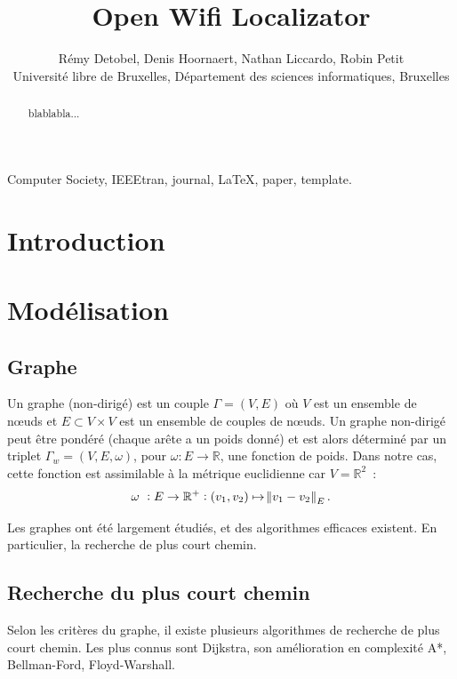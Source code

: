 \documentclass[10pt,journal,compsoc]{IEEEtran}
\newcommand{\R}{\mathbb R}
\begin{document}
\title{Open Wifi Localizator}
\author{Rémy Detobel, Denis Hoornaert, Nathan Liccardo, Robin Petit\\ Université libre de Bruxelles, Département des sciences informatiques, Bruxelles}

\maketitle

\begin{abstract}
  blablabla...
\end{abstract}
\begin{IEEEkeywords}
  Computer Society, IEEEtran, journal, \LaTeX, paper, template.
\end{IEEEkeywords}

\tableofcontents

\section{Introduction}
\section{Modélisation}
  \subsection{Graphe}
    Un graphe (non-dirigé) est un couple $\Gamma = (V, E)$ où $V$ est un ensemble de nœuds et $E \subset V \times V$ est un ensemble de couples de nœuds.
	Un graphe non-dirigé peut être pondéré (chaque arête a un poids donné) et est alors déterminé par un triplet $\Gamma_w = (V, E, \omega)$, pour
	$\omega \colon E \to \R$, une fonction de poids. Dans notre cas, cette fonction est assimilable à la métrique euclidienne car $V = \R^2$~:
	\begin{equation}
		\omega~: E \to \R^+ : (v_1, v_2) \mapsto \norm {v_1-v_2}_E.
	\end{equation}

	Les graphes ont été largement étudiés, et des algorithmes efficaces existent. En particulier, la recherche de plus court chemin.
  \subsection{Recherche du plus court chemin}
  	Selon les critères du graphe, il existe plusieurs algorithmes de recherche de plus court chemin. Les plus connus sont Dijkstra, son amélioration
	en complexité A*, Bellman-Ford, Floyd-Warshall.
\end{document}
